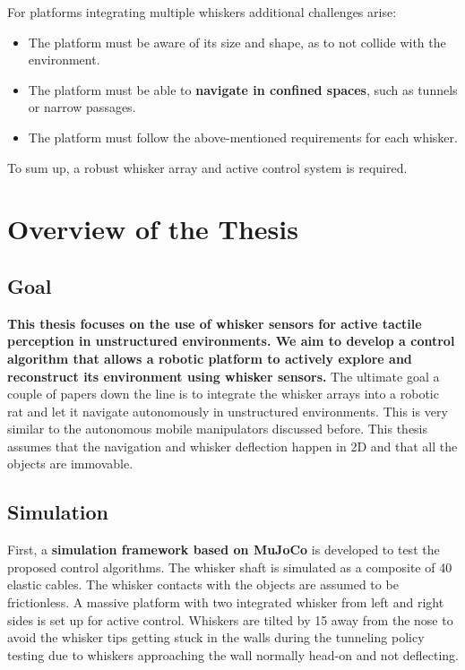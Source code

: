For platforms integrating multiple whiskers additional challenges arise:
\begin{itemize}
    \item The platform must be aware of its size and shape, as to not collide with the environment.
    \item The platform must be able to \textbf{navigate in confined spaces}, such as tunnels or narrow passages.
    \item The platform must follow the above-mentioned requirements for each whisker.
\end{itemize}

To sum up, a robust whisker array and active control system is required.


\section{Overview of the Thesis}

\subsection{Goal}
\textbf{This thesis focuses on the use of whisker sensors for active tactile perception in unstructured environments.
We aim to develop a control algorithm that allows a robotic platform to actively explore and reconstruct its environment using whisker sensors.}
The ultimate goal a couple of papers down the line is to integrate the whisker arrays into a robotic rat and let it navigate autonomously in unstructured environments.
This is very similar to the autonomous mobile manipulators discussed before.
This thesis assumes that the navigation and whisker deflection happen in 2D and that all the objects are immovable.

\subsection{Simulation}
First, a \textbf{simulation framework based on MuJoCo} is developed to test the proposed control algorithms.
The whisker shaft is simulated as a composite of 40 elastic cables.
The whisker contacts with the objects are assumed to be frictionless.
A massive platform with two integrated whisker from left and right sides is set up for active control.
Whiskers are tilted by 15\degree{} away from the nose to avoid the whisker tips getting stuck in the walls during the tunneling policy testing due to whiskers approaching the wall normally head-on and not deflecting.

